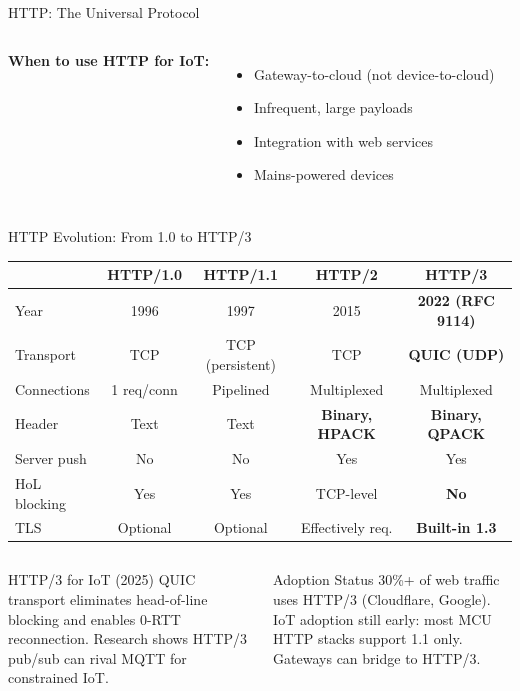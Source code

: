 \documentclass[aspectratio=169,11pt]{beamer}
\begin{document}
\begin{frame}{HTTP: The Universal Protocol}
\begin{columns}
        \vspace{0.2cm}
        \textbf{When to use HTTP for IoT:}
        \begin{itemize}
            \item Gateway-to-cloud (not device-to-cloud)
            \item Infrequent, large payloads
            \item Integration with web services
            \item Mains-powered devices
        \end{itemize}
    \end{columns}
\end{frame}

\begin{frame}{HTTP Evolution: From 1.0 to HTTP/3}
    \begin{center}
    \begin{tabular}{lcccc}
        \toprule
        & \textbf{HTTP/1.0} & \textbf{HTTP/1.1} & \textbf{HTTP/2} & \textbf{HTTP/3} \\
        \midrule
        Year & 1996 & 1997 & 2015 & \textbf{2022 (RFC 9114)} \\
        Transport & TCP & TCP (persistent) & TCP & \textbf{QUIC (UDP)} \\
        Connections & 1 req/conn & Pipelined & Multiplexed & Multiplexed \\
        Header & Text & Text & \textbf{Binary, HPACK} & \textbf{Binary, QPACK} \\
        Server push & No & No & Yes & Yes \\
        HoL blocking & Yes & Yes & TCP-level & \textbf{No} \\
        TLS & Optional & Optional & Effectively req. & \textbf{Built-in 1.3} \\
        \bottomrule
    \end{tabular}
    \end{center}
    
    \vspace{0.1cm}
    \begin{columns}
        \begin{exampleblock}{HTTP/3 for IoT (2025)}
            QUIC transport eliminates head-of-line blocking and enables 0-RTT reconnection. Research shows HTTP/3 pub/sub can rival MQTT for constrained IoT.
        \end{exampleblock}
        
        \begin{alertblock}{Adoption Status}
            30\%+ of web traffic uses HTTP/3 (Cloudflare, Google). IoT adoption still early: most MCU HTTP stacks support 1.1 only. Gateways can bridge to HTTP/3.
        \end{alertblock}
    \end{columns}
\end{frame}
\end{document}
